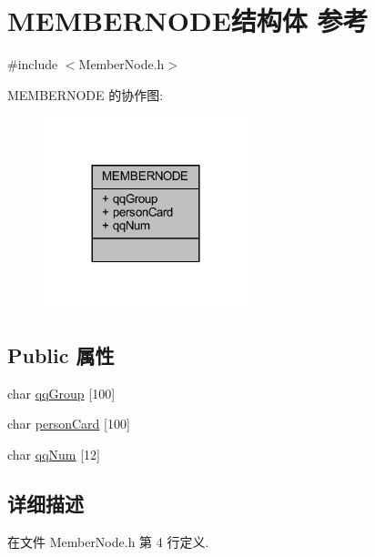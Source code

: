 \hypertarget{struct_m_e_m_b_e_r_n_o_d_e}{}\section{M\+E\+M\+B\+E\+R\+N\+O\+D\+E结构体 参考}
\label{struct_m_e_m_b_e_r_n_o_d_e}


{\ttfamily \#include $<$Member\+Node.\+h$>$}



M\+E\+M\+B\+E\+R\+N\+O\+DE 的协作图\+:
\nopagebreak
\begin{figure}[H]
\begin{center}
\leavevmode
\includegraphics[width=168pt]{struct_m_e_m_b_e_r_n_o_d_e__coll__graph}
\end{center}
\end{figure}
\subsection*{Public 属性}
\begin{DoxyCompactItemize}
\item 
char \hyperlink{struct_m_e_m_b_e_r_n_o_d_e_a62b854a5f4fe02548468603da3796a3f}{qq\+Group} \mbox{[}100\mbox{]}
\item 
char \hyperlink{struct_m_e_m_b_e_r_n_o_d_e_aad1b94e7c25d824bb10accb1d12b4f77}{person\+Card} \mbox{[}100\mbox{]}
\item 
char \hyperlink{struct_m_e_m_b_e_r_n_o_d_e_a565763e23695fb0c7db2ccbb3e987ba0}{qq\+Num} \mbox{[}12\mbox{]}
\end{DoxyCompactItemize}


\subsection{详细描述}


在文件 Member\+Node.\+h 第 4 行定义.



